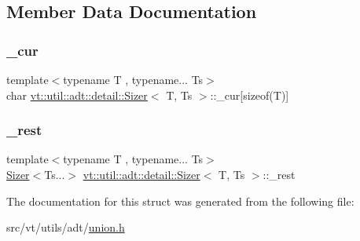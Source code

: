 \subsection{Member Data Documentation}
\mbox{\label{unionvt_1_1util_1_1adt_1_1detail_1_1_sizer_ab659dbf40d7aefdf14f206a1df10a441}} 
\subsubsection{\texorpdfstring{\+\_\+cur}{\_cur}}
{\footnotesize\ttfamily template$<$typename T , typename... Ts$>$ \\
char \hyperlink{unionvt_1_1util_1_1adt_1_1detail_1_1_sizer}{vt\+::util\+::adt\+::detail\+::\+Sizer}$<$ T, Ts $>$\+::\+\_\+cur\mbox{[}sizeof(T)\mbox{]}}

\mbox{\label{unionvt_1_1util_1_1adt_1_1detail_1_1_sizer_a7e30375672bcb283804e3589c96ffccf}} 
\subsubsection{\texorpdfstring{\+\_\+rest}{\_rest}}
{\footnotesize\ttfamily template$<$typename T , typename... Ts$>$ \\
\hyperlink{unionvt_1_1util_1_1adt_1_1detail_1_1_sizer}{Sizer}$<$Ts...$>$ \hyperlink{unionvt_1_1util_1_1adt_1_1detail_1_1_sizer}{vt\+::util\+::adt\+::detail\+::\+Sizer}$<$ T, Ts $>$\+::\+\_\+rest}



The documentation for this struct was generated from the following file\+:\begin{DoxyCompactItemize}
\item 
src/vt/utils/adt/\hyperlink{union_8h}{union.\+h}\end{DoxyCompactItemize}
